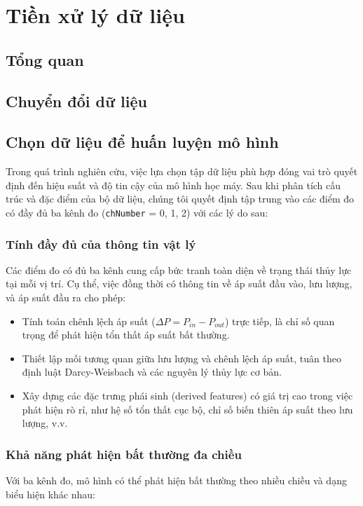 \section{Tiền xử lý dữ liệu}
\subsection{Tổng quan}
\subsection{Chuyển đổi dữ liệu}
\subsection{Chọn dữ liệu để huấn luyện mô hình}
Trong quá trình nghiên cứu, việc lựa chọn tập dữ liệu phù hợp đóng vai trò quyết định đến hiệu suất và độ tin cậy của mô hình học máy. Sau khi phân tích cấu trúc và đặc điểm của bộ dữ liệu, chúng tôi quyết định tập trung vào các điểm đo có đầy đủ ba kênh đo (\texttt{chNumber} = 0, 1, 2) với các lý do sau:

\subsubsection{Tính đầy đủ của thông tin vật lý}
Các điểm đo có đủ ba kênh cung cấp bức tranh toàn diện về trạng thái thủy lực tại mỗi vị trí. Cụ thể, việc đồng thời có thông tin về áp suất đầu vào, lưu lượng, và áp suất đầu ra cho phép:

\begin{itemize}
    \item Tính toán chênh lệch áp suất ($\Delta P = P_{in} - P_{out}$) trực tiếp, là chỉ số quan trọng để phát hiện tổn thất áp suất bất thường.
    \item Thiết lập mối tương quan giữa lưu lượng và chênh lệch áp suất, tuân theo định luật Darcy-Weisbach và các nguyên lý thủy lực cơ bản.
    \item Xây dựng các đặc trưng phái sinh (derived features) có giá trị cao trong việc phát hiện rò rỉ, như hệ số tổn thất cục bộ, chỉ số biến thiên áp suất theo lưu lượng, v.v.
\end{itemize}

\subsubsection{Khả năng phát hiện bất thường đa chiều}
Với ba kênh đo, mô hình có thể phát hiện bất thường theo nhiều chiều và dạng biểu hiện khác nhau:

